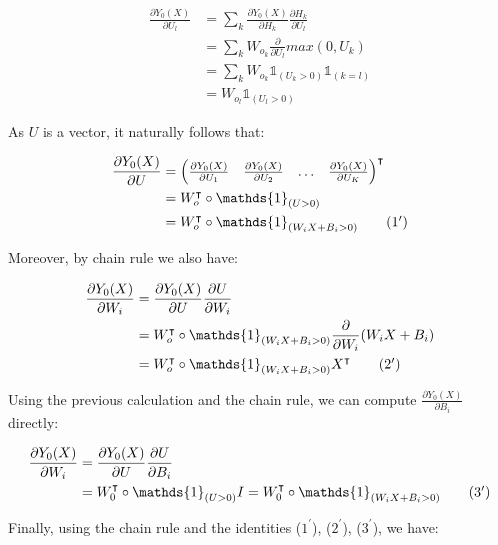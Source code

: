 \documentclass{article}
\begin{document}
\begin{itemize}
\begin{align*}
\frac{\partial Y_0(X)}{\partial U_l} &= \sum\limits_{k} \frac{\partial Y_0(X)}{\partial H_k} \frac{\partial H_k}{\partial U_l} \\
&= \sum\limits_{k} W_{o_k} \frac{\partial}{\partial U_l} max(0, U_k) \\
&= \sum\limits_{k} W_{o_k} \mathds{1}_{(U_k > 0)}\mathds{1}_{(k = l)} \\
&= W_{o_l} \mathds{1}_{(U_l > 0)}
\end{align*}

As $U$ is a vector, it naturally follows that:

\begin{align*}
\frac{\partial Y_0(X)}{\partial U} &= \begin{pmatrix}
\frac{\partial Y_0(X)}{\partial U_1} & \frac{\partial Y_0(X)}{\partial U_2} & \hdots & \frac{\partial Y_0(X)}{\partial U_K}
\end{pmatrix}^{\intercal} \\
&= W^{\intercal}_o \circ \mathds{1}_{(U > 0)} \\
&= W^{\intercal}_o \circ \mathds{1}_{(W_i X + B_i > 0)}\tag{$1^{\prime}$}
\end{align*}

Moreover, by chain rule we also have:

\begin{align*}
\frac{\partial Y_0(X)}{\partial W_i} &= \frac{\partial Y_0(X)}{\partial U} \frac{\partial U}{\partial W_i} \\
&= W^{\intercal}_o \circ \mathds{1}_{(W_i X + B_i > 0)} \frac{\partial}{\partial W_i}(W_i X + B_i) \\
&= W^{\intercal}_o \circ \mathds{1}_{(W_i X + B_i > 0)} X^{\intercal}\tag{$2^{\prime}$}
\end{align*}

Using the previous calculation and the chain rule, we can compute $\frac{\partial Y_0(X)}{\partial B_i}$ directly:

\begin{align*}
\frac{\partial Y_0(X)}{\partial W_i} &= \frac{\partial Y_0(X)}{\partial U} \frac{\partial U}{\partial B_i} \\
&= W^{\intercal}_0 \circ \mathds{1}_{(U > 0)} I = W^{\intercal}_0 \circ \mathds{1}_{(W_i X + B_i > 0)}\tag{$3^{\prime}$}
\end{align*}

Finally, using the chain rule and the identities ($1^{\prime}$), ($2^{\prime}$), ($3^{\prime}$), we have:


\end{itemize}
\end{document}
